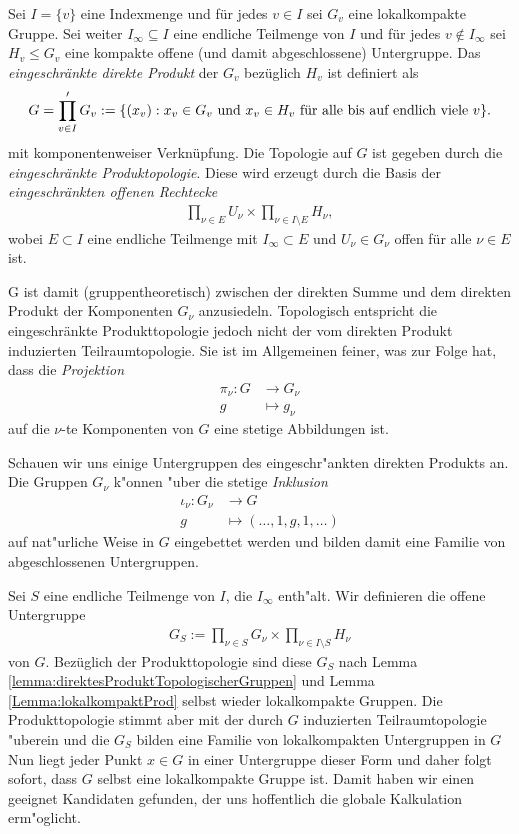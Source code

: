 		\begin{defi}
			Sei $I=\{v\}$ eine Indexmenge und für jedes $v \in I$ sei $G_v$ eine lokalkompakte Gruppe. 
			Sei weiter $I_\infty \subseteq I$ eine endliche Teilmenge von $I$ und für jedes $v \notin I_\infty$ sei $H_v\leq G_v$ eine kompakte offene (und damit abgeschlossene) Untergruppe. 
			Das \emph{eingeschränkte direkte Produkt} der $G_v$ bezüglich $H_v$ ist definiert als 
			\begin{align*}
				G = \prod\limits_{v \in I}' G_v := \{ (x_v): x_v \in G_v \text{ und } x_v \in H_v \text{ für alle bis auf endlich viele } v \}.
			\end{align*}
			mit komponentenweiser Verknüpfung. Die Topologie auf $G$ ist gegeben durch die \emph{eingeschränkte Produktopologie}. 
			Diese wird erzeugt durch die Basis der \emph{eingeschränkten offenen Rechtecke}
			\begin{align*}
				\prod_{\nu\in E} U_\nu \times \prod_{\nu\in I\setminus E} H_\nu,
			\end{align*}
			wobei $E \subset I$ eine endliche Teilmenge mit $I_\infty \subset E$ und $U_\nu \in G_\nu$ offen für alle $\nu\in E$ ist.
		\end{defi}
		G ist damit (gruppentheoretisch) zwischen der direkten Summe und dem direkten Produkt der Komponenten $G_\nu$ anzusiedeln.
		Topologisch entspricht die eingeschränkte Produkttopologie jedoch nicht der vom direkten Produkt induzierten Teilraumtopologie.
		Sie ist im Allgemeinen feiner, was zur Folge hat, dass die \emph{Projektion}
		\begin{align*}
			\pi_\nu: G &\to G_\nu\\
					g&\mapsto g_\nu
		\end{align*}
		auf die $\nu$-te Komponenten von $G$ eine stetige Abbildungen ist.
		
		Schauen wir uns einige Untergruppen des eingeschr"ankten direkten Produkts an.
		Die Gruppen $G_\nu$ k"onnen "uber die stetige \emph{Inklusion} 
		\begin{align*}
			\iota_\nu: G_\nu &\to G \\
					g &\mapsto (\dots,1,g,1,\dots)
		\end{align*}
		auf nat"urliche Weise in $G$ eingebettet werden und bilden damit eine Familie von abgeschlossenen Untergruppen.
		
		Sei $S$ eine endliche Teilmenge von $I$, die $I_\infty$ enth"alt. 
		Wir definieren die offene Untergruppe
		\begin{align*}
			G_S := \prod_{\nu\in S}G_\nu \times \prod_{\nu\in I\setminus S} H_\nu
		\end{align*}
		von $G$. 
		Bezüglich der Produkttopologie sind diese $G_S$ nach Lemma \ref{lemma:direktesProduktTopologischerGruppen} und Lemma \ref{Lemma:lokalkompaktProd} selbst wieder lokalkompakte Gruppen.
		Die Produkttopologie stimmt aber mit der durch $G$ induzierten Teilraumtopologie "uberein und die $G_S$ bilden eine Familie von lokalkompakten Untergruppen in $G$
		Nun liegt jeder Punkt $x \in G$ in einer Untergruppe dieser Form und daher folgt sofort, dass $G$ selbst eine lokalkompakte Gruppe ist.
		Damit haben wir einen geeignet Kandidaten gefunden, der uns hoffentlich die globale Kalkulation erm"oglicht.
		
